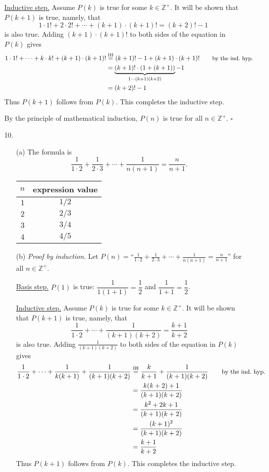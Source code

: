 \documentclass{article}
\begin{document}
\begin{enumerate}
    \underline{Inductive step.} Assume $P(k)$ is true for some $k \in \mathbb{Z}^+$. It will be shown that $P(k+1)$ is true, namely, that
    \[
    1 \cdot 1! + 2 \cdot 2! + \cdots + (k+1) \cdot (k+1)! = (k+2)! -1
    \]
    is also true. Adding $(k+1) \cdot (k+1)!$ to both sides of the equation in $P(k)$ gives
    \begin{align*}
    1 \cdot 1! + \cdots + k \cdot k! + (k+1) \cdot (k+1)! &\overset{\mathrm{IH}}{=} (k+1)!-1 + (k+1) \cdot (k+1)!\tag*{\small{by the ind.~hyp.}}\\
    &= \underbrace{(k+1)! \cdot (1+(k+1))}_{1 \cdots (k+1)(k+2)}-1\\
    &= (k+2)!-1
    \end{align*}
    Thus $P(k+1)$ follows from $P(k)$. This completes the inductive step.

    By the principle of mathematical induction, $P(n)$ is true for all $n \in \mathbb{Z}^+$. $\square$
    \item[10.]
        \begin{itemize}
            \item[(a)] The formula is
            \[
            \frac{1}{1\cdot 2} + \frac{1}{2\cdot 3} + \cdots + \frac{1}{n(n+1)} = \frac{n}{n+1}.
            \]
            \begin{tabular}{cc}\hline
            $n$ & expression value\\\hline
            $1$ & $1/2$ \\
            $2$ & $2/3$ \\
            $3$ & $3/4$ \\
            $4$ & $4/5$ \\\hline
            \end{tabular}
            \item[(b)] \textit{Proof by induction.} Let $P(n) = \text{``}\frac{1}{1\cdot 2} + \frac{1}{2\cdot 3} + \cdots + \frac{1}{n(n+1)} = \frac{n}{n+1}\text{''}$ for all $n \in \mathbb{Z}^+$.

            \underline{Basis step.} $P(1)$ is true: $\dfrac{1}{1(1+1)} = \dfrac{1}{2}$ and $\dfrac{1}{1+1} = \dfrac{1}{2}$.

            \underline{Inductive step.} Assume $P(k)$ is true for some $k \in \mathbb{Z}^+$. It will be shown that $P(k+1)$ is true, namely, that
            \[
            \frac{1}{1\cdot 2} + \cdots + \frac{1}{(k+1)(k+2)} = \frac{k+1}{k+2}
            \]
            is also true. Adding $\frac{1}{(k+1)(k+2)}$ to both sides of the equation in $P(k)$ gives
            \begin{align*}
            \frac{1}{1\cdot 2} + \cdots + \frac{1}{k(k+1)} + \frac{1}{(k+1)(k+2)} &\overset{\mathrm{IH}}{=} \frac{k}{k+1} + \frac{1}{(k+1)(k+2)}\tag*{\small{by the ind.~hyp.}}\\
            &= \frac{k(k+2)+1}{(k+1)(k+2)}\\
            &= \frac{k^2+2k+1}{(k+1)(k+2)}\\
            &= \frac{(k+1)^2}{(k+1)(k+2)}\\
            &= \frac{k+1}{k+2}
            \end{align*}
            Thus $P(k+1)$ follows from $P(k)$. This completes the inductive step.


\end{itemize}
\end{enumerate}
\end{document}
